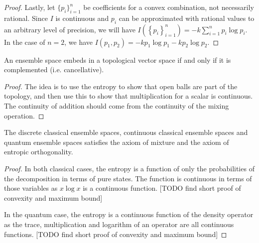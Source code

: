 \begin{proof}
	Lastly, let $\{p_i\}_{i=1}^{n}$ be coefficients for a convex combination, not necessarily rational. Since $I$ is continuous and $p_i$ can be approximated with rational values to an arbitrary level of precision, we will have $I\left(\left\{ p_i\right\}_{i=1}^{n}\right) = - k \sum_{i=1}^{n} p_i \log p_i$. In the case of $n=2$, we have $I(p_1, p_2) = - k p_1 \log p_1 - k p_2 \log p_2$.	
\end{proof}

\begin{conj}\label{pm_es_ensemblesAreTVS}
	An ensemble space embeds in a topological vector space if and only if it is complemented (i.e. cancellative).
\end{conj}

\begin{proof}
	The idea is to use the entropy to show that open balls are part of the topology, and then use this to show that multiplication for a scalar is continuous. The continuity of addition should come from the continuity of the mixing operation.
\end{proof}

\begin{prop}
	The discrete classical ensemble spaces, continuous classical ensemble spaces and quantum ensemble spaces satisfies the axiom of mixture and the axiom of entropic orthogonality.
\end{prop}

\begin{proof}
	In both classical cases, the entropy is a function of only the probabilities of the decomposition in terms of pure states. The function is continuous in terms of those variables as $x \log x$ is a continuous function. [TODO find short proof of convexity and maximum bound]
	
	In the quantum case, the entropy is a continuous function of the density operator as the trace, multiplication and logarithm of an operator are all continuous functions. [TODO find short proof of convexity and maximum bound]
\end{proof}

